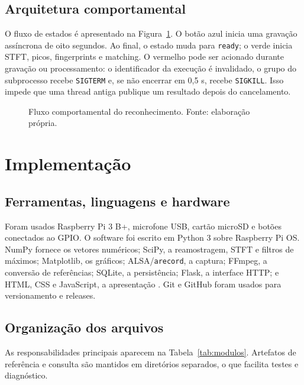\documentclass[12pt,a4paper]{article}
\newcommand{\codigo}[1]{\texttt{#1}}
\begin{document}
\subsection{Arquitetura comportamental}

O fluxo de estados é apresentado na Figura~\ref{fig:fluxo}. O botão azul inicia
uma gravação assíncrona de oito segundos. Ao final, o estado muda para
\codigo{ready}; o verde inicia STFT, picos, fingerprints e matching. O vermelho
pode ser acionado durante gravação ou processamento: o identificador da execução
é invalidado, o grupo do subprocesso recebe \codigo{SIGTERM} e, se não encerrar
em 0,5 s, recebe \codigo{SIGKILL}. Isso impede que uma thread antiga publique um
resultado depois do cancelamento.

\begin{figure}[H]
    \centering
    \resizebox{0.95\textwidth}{!}{}
    \caption{Fluxo comportamental do reconhecimento. Fonte: elaboração própria.}
    \label{fig:fluxo}
\end{figure}

\section{Implementação}

\subsection{Ferramentas, linguagens e hardware}

Foram usados Raspberry Pi 3 B+, microfone USB, cartão microSD e botões conectados
ao GPIO. O software foi escrito em Python 3 sobre Raspberry Pi OS. NumPy fornece
os vetores numéricos; SciPy, a reamostragem, STFT e filtros de máximos; Matplotlib,
os gráficos; ALSA/\codigo{arecord}, a captura; FFmpeg, a conversão de referências;
SQLite, a persistência; Flask, a interface HTTP; e HTML, CSS e JavaScript, a
apresentação \cite{numpy2026,scipy2026,flask2026}. Git e GitHub foram usados para
versionamento e releases.

\subsection{Organização dos arquivos}

As responsabilidades principais aparecem na Tabela~\ref{tab:modulos}. Artefatos
de referência e consulta são mantidos em diretórios separados, o que facilita
testes e diagnóstico.
\end{document}

